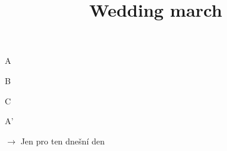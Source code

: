 \documentclass[timestamp]{jazzgrid}
\title{Wedding march}
\begin{document}
\maketitle
\begin{musicsection}{A}
\barline
	{}
	{\barfour{}{}{}{}{}}
	{\barfour{}{}{}{}{}}
	{\barfour{}{}{}{}{}}
\end{musicsection}

\begin{musicsection}{B}
\barline
	{}
	{}
	{}
	{}
\end{musicsection}

\begin{musicsection}{C}
\barline
	{}
	{}
	{}
	{}
\barline
	{}
	{}
	{}
	{}
\end{musicsection}

\begin{musicsection}{A'}
\barline
	{}
	{}
	{}
	{}
\end{musicsection}

\footnotesize
\begin{description}[noitemsep,align=right,labelwidth=\widthof{\bfseries{ABB ABB CBB CBB A'}}]
	\item [ABB ABB CBB CBB A'] $\rightarrow$ Jen pro ten dnešní den
\end{description}
\end{document}
